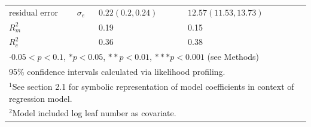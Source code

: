 \documentclass[11pt, oneside]{amsart}
\begin{document}
\begin{table}[!htp]
\begin{tabular}{lllll}
residual error & $\sigma_{e}$ & $0.22 (0.2, 0.24)$ & $12.57 (11.53, 13.73)$ & \\
$R^{2}_{m}$ &  & 0.19 & 0.15 & \\
$R^{2}_{c}$ &  & 0.36 & 0.38 & \\
\bottomrule
\multicolumn{5}{l}{$\cdot0.05<p<0.1$, $*p<0.05$, $**p<0.01$, $***p<0.001$ (see Methods)}\\
\multicolumn{5}{l}{95\% confidence intervals calculated via likelihood profiling.} \\
\multicolumn{5}{l}{$^{1}$See section 2.1 for symbolic representation of model coefficients in context of regression model.} \\ 
\multicolumn{5}{l}{$^{2}$Model included log leaf number as covariate.} \\
\end{tabular}
\label{tableS4}
\end{table}

\newpage
\end{document}
